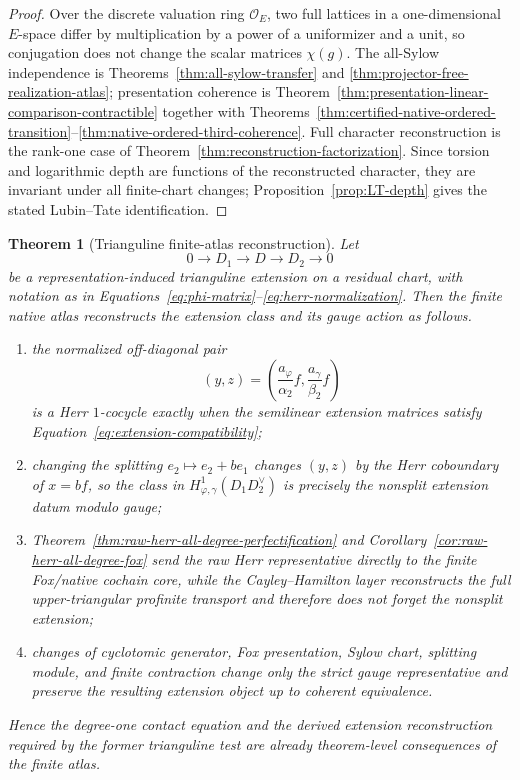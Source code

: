 \documentclass[11pt]{article}
\newtheorem{theorem}{Theorem}[section]
\theoremstyle{definition}
\begin{document}
\begin{proof}
Over the discrete valuation ring $\mathcal O_E$, two full lattices in a one-dimensional $E$-space differ by multiplication by a power of a uniformizer and a unit, so conjugation does not change the scalar matrices $\chi(g)$.  The all-Sylow independence is Theorems~\ref{thm:all-sylow-transfer} and \ref{thm:projector-free-realization-atlas}; presentation coherence is Theorem~\ref{thm:presentation-linear-comparison-contractible} together with Theorems~\ref{thm:certified-native-ordered-transition}--\ref{thm:native-ordered-third-coherence}.  Full character reconstruction is the rank-one case of Theorem~\ref{thm:reconstruction-factorization}.  Since torsion and logarithmic depth are functions of the reconstructed character, they are invariant under all finite-chart changes; Proposition~\ref{prop:LT-depth} gives the stated Lubin--Tate identification.
\end{proof}

\begin{theorem}[Trianguline finite-atlas reconstruction]\label{thm:trianguline-finite-atlas-reconstruction}
Let
\[
 0\longrightarrow D_1\longrightarrow D\longrightarrow D_2\longrightarrow0
\]
be a representation-induced trianguline extension on a residual chart, with notation as in Equations~\eqref{eq:phi-matrix}--\eqref{eq:herr-normalization}.  Then the finite native atlas reconstructs the extension class and its gauge action as follows.
\begin{enumerate}[label=\textnormal{(\roman*)}]
\item the normalized off-diagonal pair
\[
 (y,z)=\left(\frac{a_\varphi}{\alpha_2}f,
              \frac{a_\gamma}{\beta_2}f\right)
\]
is a Herr $1$-cocycle exactly when the semilinear extension matrices satisfy Equation~\eqref{eq:extension-compatibility};
\item changing the splitting $e_2\mapsto e_2+be_1$ changes $(y,z)$ by the Herr coboundary of $x=bf$, so the class in $H^1_{\varphi,\gamma}(D_1D_2^{\vee})$ is precisely the nonsplit extension datum modulo gauge;
\item Theorem~\ref{thm:raw-herr-all-degree-perfectification} and Corollary~\ref{cor:raw-herr-all-degree-fox} send the raw Herr representative directly to the finite Fox/native cochain core, while the Cayley--Hamilton layer reconstructs the full upper-triangular profinite transport and therefore does not forget the nonsplit extension;
\item changes of cyclotomic generator, Fox presentation, Sylow chart, splitting module, and finite contraction change only the strict gauge representative and preserve the resulting extension object up to coherent equivalence.
\end{enumerate}
Hence the degree-one contact equation and the derived extension reconstruction required by the former trianguline test are already theorem-level consequences of the finite atlas.
\end{theorem}
\end{document}
